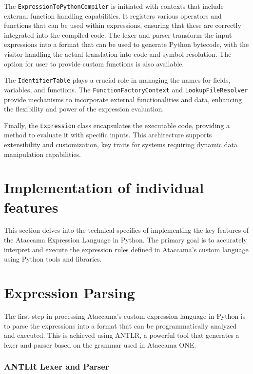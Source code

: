 The \texttt{ExpressionToPythonCompiler} is initiated with contexts that include external function handling capabilities. It registers various operators and functions that can be used within expressions, ensuring that these are correctly integrated into the compiled code. The lexer and parser transform the input expressions into a format that can be used to generate Python bytecode, with the visitor handling the actual translation into code and symbol resolution. The option for user to provide custom functions is also available.

The \texttt{IdentifierTable} plays a crucial role in managing the names for fields, variables, and functions. The \texttt{FunctionFactoryContext} and \texttt{LookupFileResolver} provide mechanisms to incorporate external functionalities and data, enhancing the flexibility and power of the expression evaluation.

Finally, the \texttt{Expression} class encapsulates the executable code, providing a method to evaluate it with specific inputs. This architecture supports extensibility and customization, key traits for systems requiring dynamic data manipulation capabilities.

\section{Implementation of individual features}

This section delves into the technical specifics of implementing the key features of the Ataccama Expression Language in Python. The primary goal is to accurately interpret and execute the expression rules defined in Ataccama's custom language using Python tools and libraries.

\section{Expression Parsing}

The first step in processing Ataccama’s custom expression language in Python is to parse the expressions into a format that can be programmatically analyzed and executed. This is achieved using ANTLR, a powerful tool that generates a lexer and parser based on the grammar used in Ataccama ONE.

\subsubsection{ANTLR Lexer and Parser}

